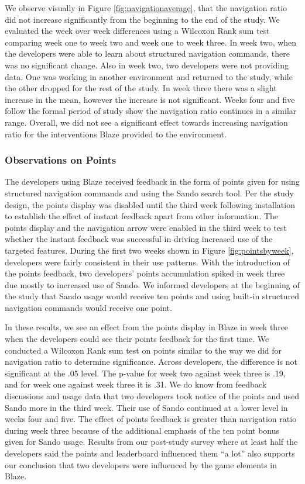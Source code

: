 \documentclass{sig-alternate}
\begin{document}
We observe visually in Figure \ref{fig:navigationaverage}, that the navigation ratio did not increase significantly from the beginning to the end of the study.  We evaluated the week over week differences using a Wilcoxon Rank sum test \cite{RefWorks:118} comparing week one to week two and week one to week three.    In week two, when the developers were able to learn about structured navigation commands, there was no significant change.  Also in week two, two developers were not providing data.  One was working in another environment and returned to the study, while the other dropped for the rest of the study.  In week three there was a slight increase in the mean, however the increase is not significant.  Weeks four and five follow the formal period of study show the navigation ratio continues in a similar range.  Overall, we did not see a significant effect towards increasing navigation ratio for the interventions Blaze provided to the environment.    

\subsubsection{Observations on Points}

The developers using Blaze received feedback in the form of points given for using structured navigation commands and using the Sando search tool\cite{Shepherd2012Sando}.  Per the study design, the points display was disabled until the third week following installation to establish the effect of instant feedback apart from other information.  The points display and the navigation arrow were enabled in the third week to test whether the instant feedback was successful in driving increased use of the targeted features. During the first two weeks shown in Figure \ref{fig:pointsbyweek}, developers were fairly consistent in their use patterns.  With the introduction of the points feedback, two developers' points accumulation spiked in week three due mostly to increased use of Sando.   We informed developers at the beginning of the study that Sando usage would receive ten points and using built-in structured navigation commands would receive one point.  

In these results, we see an effect from the points display in Blaze in week three when the developers could see their points feedback for the first time.  We conducted a Wilcoxon Rank sum test on points similar to the way we did for navigation ratio to determine significance.  Across developers, the difference is not significant at the .05 level. The p-value for week two against week three is .19, and for week one against week three it is .31.  We do know from feedback discussions and usage data that two developers took notice of the points and used Sando more in the third week.  Their use of Sando continued at a lower level in weeks four and five.   The effect of points feedback is greater than navigation ratio during week three because of the additional emphasis of the ten point bonus given for Sando usage.  Results from our post-study survey where at least half the developers said the points and leaderboard influenced them ``a lot'' also supports our conclusion that two developers were influenced by the game elements in Blaze.  
\end{document}
